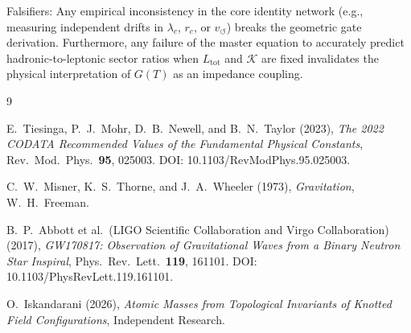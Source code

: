 \documentclass[11pt, a4paper]{article}
\begin{document}
        Falsifiers: Any empirical inconsistency in the core identity network (e.g., measuring independent drifts in $\lambda_c$, $r_c$, or $v_{\circlearrowleft}$) breaks the geometric gate derivation. Furthermore, any failure of the master equation to accurately predict hadronic-to-leptonic sector ratios when $L_{\mathrm{tot}}$ and $\mathcal{K}$ are fixed invalidates the physical interpretation of $G(T)$ as an impedance coupling.
        
        \begin{thebibliography}{9}
            
            E.~Tiesinga, P.~J.~Mohr, D.~B.~Newell, and B.~N.~Taylor (2023),
            \textit{The 2022 CODATA Recommended Values of the Fundamental Physical Constants},
            Rev.\ Mod.\ Phys.\ \textbf{95}, 025003.
            DOI: 10.1103/RevModPhys.95.025003.
            
            C.~W.~Misner, K.~S.~Thorne, and J.~A.~Wheeler (1973),
            \textit{Gravitation}, W.\ H.\ Freeman.
            
            B.~P.~Abbott et al.\ (LIGO Scientific Collaboration and Virgo Collaboration) (2017),
            \textit{GW170817: Observation of Gravitational Waves from a Binary Neutron Star Inspiral},
            Phys.\ Rev.\ Lett.\ \textbf{119}, 161101.
            DOI: 10.1103/PhysRevLett.119.161101.
            
            O.~Iskandarani (2026),
            \textit{Atomic Masses from Topological Invariants of Knotted Field Configurations},
            Independent Research.
        
        \end{thebibliography}
    
    
\end{document}
